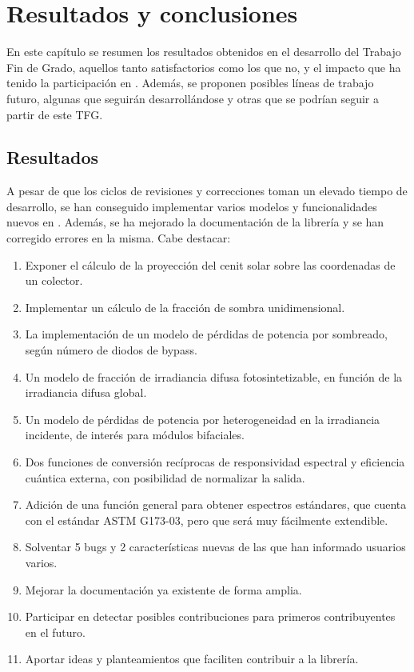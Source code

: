 \chapter{Resultados y conclusiones} \label{chp:resultados}

En este capítulo se resumen los resultados obtenidos en el desarrollo del Trabajo Fin de Grado, aquellos tanto satisfactorios como los que no, y el impacto que ha tenido la participación en \pvlibpy{}. Además, se proponen posibles líneas de trabajo futuro, algunas que seguirán desarrollándose y otras que se podrían seguir a partir de este TFG.


\section{Resultados} \label{sct:resultados_resultados}

A pesar de que los ciclos de revisiones y correcciones toman un elevado tiempo de desarrollo, se han conseguido implementar varios modelos y funcionalidades nuevos en \pvlibpy{}. Además, se ha mejorado la documentación de la librería y se han corregido errores en la misma. Cabe destacar:

\begin{enumerate}
    \item Exponer el cálculo de la proyección del \gls{cenit} solar sobre las coordenadas de un colector.
    \item Implementar un cálculo de la fracción de \gls{sombra} unidimensional.
    \item La implementación de un modelo de pérdidas de potencia por sombreado, según número de \gls{diodos de bypass}.
    \item Un modelo de fracción de irradiancia difusa fotosintetizable, en función de la irradiancia \gls{difusa} global.
    \item Un modelo de pérdidas de potencia por heterogeneidad en la irradiancia incidente, de interés para \gls{módulos bifaciales}.
    \item Dos funciones de conversión recíprocas de responsividad espectral y \gls{eficiencia cuántica externa}, con posibilidad de normalizar la salida.
    \item Adición de una función general para obtener espectros estándares, que cuenta con el \gls{estándar} ASTM G173-03, pero que será muy fácilmente extendible.
    \item Solventar 5 bugs y 2 características nuevas de las que han informado usuarios varios.
    \item Mejorar la documentación ya existente de forma amplia.
    \item Participar en detectar posibles contribuciones para primeros contribuyentes en el futuro.
    \item Aportar ideas y planteamientos que faciliten contribuir a la librería.
\end{enumerate}

